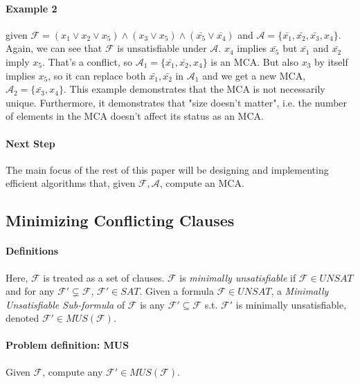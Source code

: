 \documentclass[]{article}
\begin{document}
	\paragraph{Example 2 } given  $\mathcal{F} = (x_1 \lor x_2 \lor x_5) \land (x_3 \lor x_5) \land (\bar{x_5} \lor \bar{x_4})$ and $\mathcal{A} =\{\bar{x_1}, \bar{x_2}, \bar{x_3}, x_4\}$. Again, we can see that $ \mathcal{F} $ is unsatisfiable under $ \mathcal{A} $. $ x_4 $ implies $ \bar{x_5} $ but $\bar{x_1}$ and $ \bar{x_2}$ imply $ x_5 $. That's a conflict, so $\mathcal{A}_1 =\{\bar{x_1}, \bar{x_2}, x_4\}$ is an MCA. But also $ x_3 $ by itself implies $ x_5 $, so it can replace both $ \bar{x_1}, \bar{x_2} $ in $ \mathcal{A}_1 $ and we get a new MCA, $\mathcal{A}_2 =\{\bar{x_3}, x_4\}$. 
	This example demonstrates that the MCA is not necessarily unique. Furthermore, it demonstrates that "size doesn't matter", i.e. the number of elements in the MCA doesn't affect its status as an MCA.
	
	\paragraph{Next Step} The main focus of the rest of this paper will be designing and implementing efficient algorithms that, given $\mathcal{F}, \mathcal{A}$, compute an MCA.
	
	\subsection[Similar Problem]{Minimizing Conflicting Clauses}
	\paragraph{Definitions} Here, $ \mathcal{F} $ is treated as a set of clauses. $ \mathcal{F} $ is \textit{minimally unsatisfiable} if $ \mathcal{F} \in UNSAT $ and for any $ \mathcal{F}' \subsetneq \mathcal{F} $, $ \mathcal{F}' \in SAT$. Given a formula $ \mathcal{F} \in UNSAT $, a \textit{Minimally Unsatisfiable Sub-formula} of $ \mathcal{F} $ is any $ \mathcal{F}' \subseteq \mathcal{F} $ s.t. $ \mathcal{F}' $ is minimally unsatisfiable, denoted $ \mathcal{F}' \in MUS(\mathcal{F}) $.

	\paragraph{Problem definition: MUS} Given $ \mathcal{F} $, compute any $ \mathcal{F}' \in MUS(\mathcal{F}) $.
	
\end{document}
